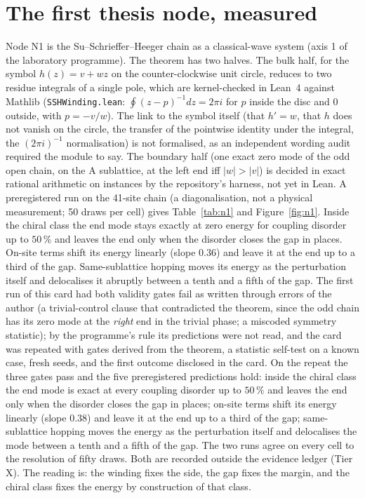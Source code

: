 \documentclass[11pt,a4paper]{article}
\begin{document}


\section{The first thesis node, measured}\label{sec:n1}
Node N1 is the Su--Schrieffer--Heeger chain as a classical-wave system (axis 1 of the laboratory programme). The theorem has two halves. The bulk half, for the symbol $h(z)=v+wz$ on the counter-clockwise unit circle, reduces to two residue integrals of a single pole, which are kernel-checked in Lean~4 against Mathlib (\texttt{SSHWinding.lean}: $\oint(z-p)^{-1}dz=2\pi i$ for $p$ inside the disc and $0$ outside, with $p=-v/w$). The link to the symbol itself (that $h'=w$, that $h$ does not vanish on the circle, the transfer of the pointwise identity under the integral, the $(2\pi i)^{-1}$ normalisation) is not formalised, as an independent wording audit required the module to say. The boundary half (one exact zero mode of the odd open chain, on the A sublattice, at the left end iff $|w|>|v|$) is decided in exact rational arithmetic on instances by the repository's harness, not yet in Lean.
A preregistered run on the 41-site chain (a diagonalisation, not a physical measurement; 50 draws per cell) gives Table~\ref{tab:n1} and Figure~\ref{fig:n1}. Inside the chiral class the end mode stays exactly at zero energy for coupling disorder up to $50\,\%$ and leaves the end only when the disorder closes the gap in places. On-site terms shift its energy linearly (slope $0.36$) and leave it at the end up to a third of the gap. Same-sublattice hopping moves its energy as the perturbation itself and delocalises it abruptly between a tenth and a fifth of the gap. The first run of this card had both validity gates fail as written through errors of the author (a trivial-control clause that contradicted the theorem, since the odd chain has its zero mode at the \emph{right} end in the trivial phase; a miscoded symmetry statistic); by the programme's rule its predictions were not read, and the card was repeated with gates derived from the theorem, a statistic self-test on a known case, fresh seeds, and the first outcome disclosed in the card. On the repeat the three gates pass and the five preregistered predictions hold: inside the chiral class the end mode is exact at every coupling disorder up to $50\,\%$ and leaves the end only when the disorder closes the gap in places; on-site terms shift its energy linearly (slope $0.38$) and leave it at the end up to a third of the gap; same-sublattice hopping moves the energy as the perturbation itself and delocalises the mode between a tenth and a fifth of the gap. The two runs agree on every cell to the resolution of fifty draws. Both are recorded outside the evidence ledger (Tier X).
The reading is: the winding fixes the side, the gap fixes the margin, and the chiral class fixes the energy by construction of that class.
\end{document}
